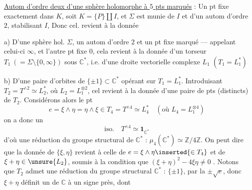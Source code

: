  

 
\uline{Autom d'ordre deux d'une sphère holomorphe \inserted{$\Sigma$} à
 $5$ pts marqués} : Un pt fixe exactement dans $K$,
soit $K=\{P\}\amalg I$, et $\Sigma$ est munie de $I$ et d'un autom
\inserted{$\sigma$} d'ordre $2$, stabilisant $I$,
Donc cel. revient à la donnée

a) D'une sphère hol. $\Sigma$, un autom \inserted{$\sigma$} d'ordre $2$
et un pt fixe marqué --- appelant celui-ci $\infty$, et l'autre pt fixe $0$,
cela revient à la donnée d'un torseur $T_1\ (= \Sigma\setminus\{0,\infty\})$
sous $\mathbb C^*$, i.e. d'une droite vectorielle complexe $L_1$
$(T_1=L_1^*)$

b) D'une paire d'orbites  de
$\{\pm1\}\subset\mathbb C^*$ opérant sur $T_1=L_1^*$.
Introduisant $T_2=T^{\wedge2}\simeq L_2^*$, où
$L_2=L_1^{\otimes2}$, cel revient à la donnée d'une paire de pts
\inserted{$\{\xi,\eta\}$} (distincts) de $T_2$.
Considérons alors le pt
\[
 e=\xi\wedge\eta=\eta\wedge\xi
 \in T_4=T^{\wedge4}\simeq L_4^*
 \quad(\text{où }L_4=L_1^{\otimes4})
\]
on a donc un
\[
 \mathrm{iso.}\quad T^{\wedge4}\simeq\mathbf1_{\mathbb C^*}
\]
d'où une réduction du groupe structural 
de $\mathbb C^*$ : $\mu_4(\mathbb C^*)\simeq\mathbb Z/4\mathbb Z$.
On peut dire que la donnée de $\{\xi,\eta\}$ revient à celle de
$e=\xi\wedge\eta\inserted{\in T_4}$ et de
$\xi+\eta\in\unsure{L_2}$, soumis à la condition que
$(\xi+\eta)^2-4\xi\eta\ne0$ .
Notons 
que $T_2$ admet une réduction du groupe structural $\mathbb C^*$ :
$\{\pm1\}$, par la  $\pm\sqrt e$, donc $\xi+\eta$
définit un  de $\mathbb C$ à un signe près, dont
  


  




  


